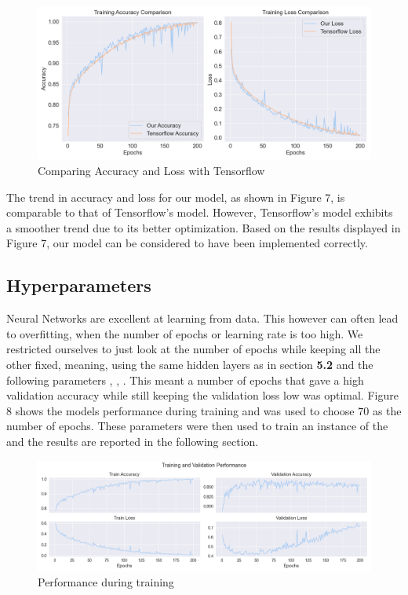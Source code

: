 \begin{figure}[H]
    \centering
    \includegraphics[scale=0.45]{figures_for_report/tensorflow_vs_our}
    \captionsetup{justification=centering,margin=2cm}
    \caption{Comparing Accuracy and Loss with Tensorflow}
\end{figure}

The trend in accuracy and loss for our model, as shown in Figure 7, is comparable to that of Tensorflow's model.
However, Tensorflow's model exhibits a smoother trend due to its better optimization.
Based on the results displayed in Figure 7, our model can be considered to have been implemented correctly.

\subsection{Hyperparameters}
Neural Networks are excellent at learning from data.
This however can often lead to overfitting, when the number of epochs or learning rate is too high.
We restricted ourselves to just look at the number of epochs while keeping all the other fixed, meaning, using the same hidden layers as in section \textbf{5.2} and the following parameters
, , .
This meant a number of epochs that gave a high validation accuracy while still keeping the validation loss low was optimal.
Figure 8 shows the models performance during training and was used to choose $70$ as the number of epochs.
These parameters were then used to train an instance of the  and the results are reported in the following section.
\begin{figure}[H]
    \centering
    \includegraphics[scale=0.45]{figures_for_report/train_validation_nn_performance}
    \captionsetup{justification=centering,margin=2cm}
    \caption{Performance during training}
\end{figure}


